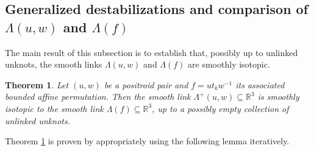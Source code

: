 \documentclass[10pt]{amsart}
\theoremstyle{plain}
\newtheorem{thm}{Theorem}[section]
\theoremstyle{definition}
\theoremstyle{remark}
\numberwithin{equation}{section}
\newcommand{\R}{\mathbb{R}}
\newcommand{\La}{\Lambda}
\newcommand{\sse}{\subseteq}
\begin{document}
\subsection{Generalized destabilizations and comparison of $\La(u,w)$ and $\La(f)$}\label{ssec:destabilization} The main result of this subsection is to establish that, possibly up to unlinked unknots, the smooth links $\La(u,w)$ and $\La(f)$ are smoothly isotopic.%
\begin{thm}\label{thm:Richardson_to_juggling}
Let $(u,w)$ be a positroid pair and $f = ut_{k}w^{-1}$ its associated bounded affine permutation. Then the smooth link $\La^{+}(u,w)\sse\R^3$ is smoothly isotopic to the smooth link $\La(f)\sse\R^3$, up to a possibly empty collection of unlinked unknots.
\end{thm}

Theorem \ref{thm:Richardson_to_juggling} is proven by appropriately using the following lemma iteratively.
\end{document}
